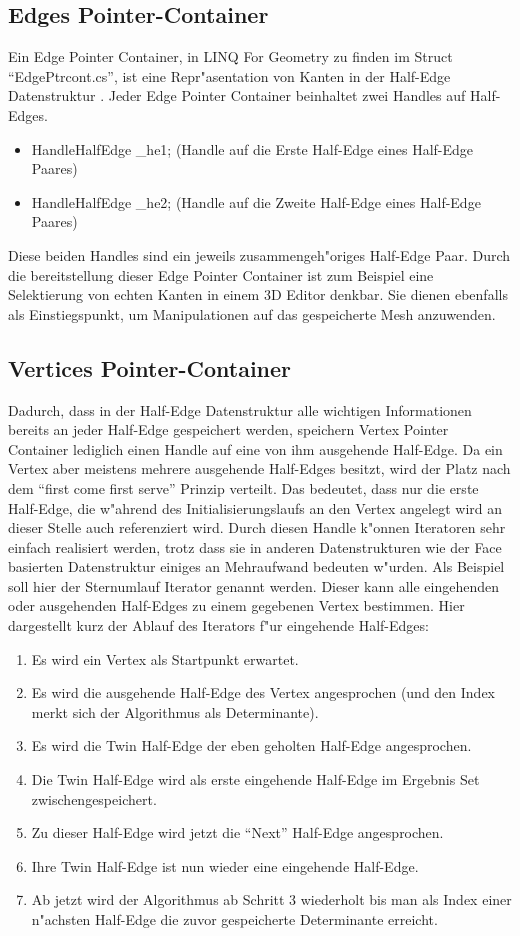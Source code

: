 \documentclass[pagesize, paper=a4, fontsize=12pt,titlepage=true, headings=small, headnosepline, abstractoff, liststotoc, nochapterprefix, plainheadsepline]{scrreprt}
\newcommand{\LFGS}{LINQ For Geometry }
\newcommand{\HES}{Half-Edge Datenstruktur }
\begin{document}
		\subsection {Edges Pointer-Container}
			Ein Edge Pointer Container, in \LFGS zu finden im Struct "`EdgePtrcont.cs"', ist eine Repr"asentation von Kanten in der \HES. Jeder Edge Pointer Container beinhaltet zwei Handles auf Half-Edges.
\begin{itemize}
\item HandleHalfEdge \_he1; (Handle auf die Erste Half-Edge eines Half-Edge Paares)
\item HandleHalfEdge \_he2; (Handle auf die Zweite Half-Edge eines Half-Edge Paares)
\end{itemize}
Diese beiden Handles sind ein jeweils zusammengeh"origes Half-Edge Paar. Durch die bereitstellung dieser Edge Pointer Container ist zum Beispiel eine Selektierung von echten Kanten in einem 3D Editor denkbar. Sie dienen ebenfalls als Einstiegspunkt, um Manipulationen auf das gespeicherte Mesh anzuwenden.
		\subsection {Vertices Pointer-Container}
			Dadurch, dass in der Half-Edge Datenstruktur alle wichtigen Informationen bereits an jeder Half-Edge gespeichert werden, speichern Vertex Pointer Container lediglich einen Handle auf eine von ihm ausgehende Half-Edge. Da ein Vertex aber meistens mehrere ausgehende Half-Edges besitzt, wird der Platz nach dem "`first come first serve"' Prinzip verteilt. Das bedeutet, dass nur die erste Half-Edge, die w"ahrend des Initialisierungslaufs an den Vertex angelegt wird an dieser Stelle auch referenziert wird. Durch diesen Handle k"onnen Iteratoren sehr einfach realisiert werden, trotz dass sie in anderen Datenstrukturen wie der Face basierten Datenstruktur einiges an Mehraufwand bedeuten w"urden. Als Beispiel soll hier der Sternumlauf Iterator genannt werden. Dieser kann alle eingehenden oder ausgehenden Half-Edges zu einem gegebenen Vertex bestimmen. Hier dargestellt kurz der Ablauf des Iterators f"ur eingehende Half-Edges:
\begin{enumerate}
\item Es wird ein Vertex als Startpunkt erwartet.
\item Es wird die ausgehende Half-Edge des Vertex angesprochen (und den Index merkt sich der Algorithmus als Determinante).
\item Es wird die Twin Half-Edge der eben geholten Half-Edge angesprochen.
\item Die Twin Half-Edge wird als erste eingehende Half-Edge im Ergebnis Set zwischengespeichert.
\item Zu dieser Half-Edge wird jetzt die "`Next"' Half-Edge angesprochen.
\item Ihre Twin Half-Edge ist nun wieder eine eingehende Half-Edge.
\item Ab jetzt wird der Algorithmus ab Schritt 3 wiederholt bis man als Index einer n"achsten Half-Edge die zuvor gespeicherte Determinante erreicht.
\end{enumerate}
\end{document}
